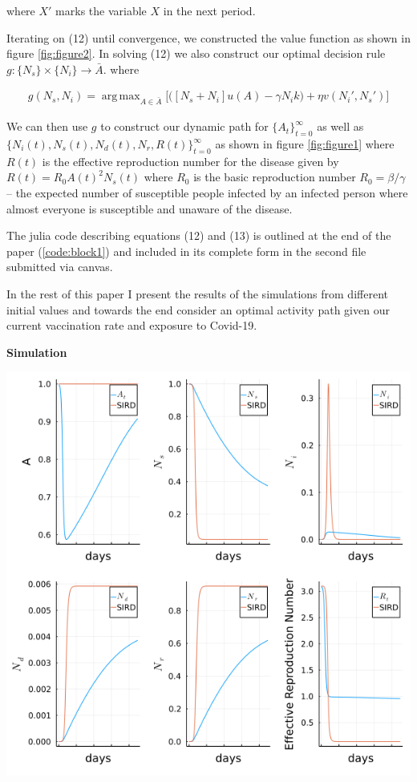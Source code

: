 \documentclass[12pt]{article}
\DeclareMathOperator*{\argmax}{arg\,max}
\begin{document}
where $X'$ marks the variable  $X$ in the next period.

Iterating on (12) until convergence, we constructed the value function as shown in figure \ref{fig:figure2}. In solving (12) we also construct our optimal decision rule $g : \{N_s\} \times \{N_i\} \to \bar{A}$.
where  

\begin{align}
	g(N_s, N_i) = \argmax_{A \in \bar{A}} \bigg[ \big( [N_s + N_i] u(A) - \gamma N_i k \big) + \eta v(N_i', N_s') \bigg] 
\end{align}

We can then use $g$ to construct our dynamic path for $\{A_t\}_{t=0}^{\infty}$ as well as $\{N_i(t), N_s(t), N_d(t), N_r, R(t)\}_{t=0}^{\infty}$ as shown in figure \ref{fig:figure1} where $R(t)$ is the effective 
reproduction number for the disease given by $R(t) = R_0 A(t)^2 N_s(t)$ where $R_0$ is the basic reproduction number $R_0 = \beta / \gamma$ 
-- the expected number of susceptible people infected by an infected person where almost everyone is susceptible and unaware of the disease.

The julia code describing equations (12) and (13) is outlined at the end of the paper (\ref{code:block1}) and included in its complete form in the second file submitted via canvas.


In the rest of this paper I present the results of the simulations from different initial values and towards the end consider 
an optimal activity path given our current vaccination rate and exposure to Covid-19.

\newpage
\begin{center}
	\textbf{Simulation}\par\medskip
	\includegraphics[width = \textwidth]{../plots/plots1.png}
	\par\medskip
	\label{fig:figure1}
\end{center}
\end{document}

